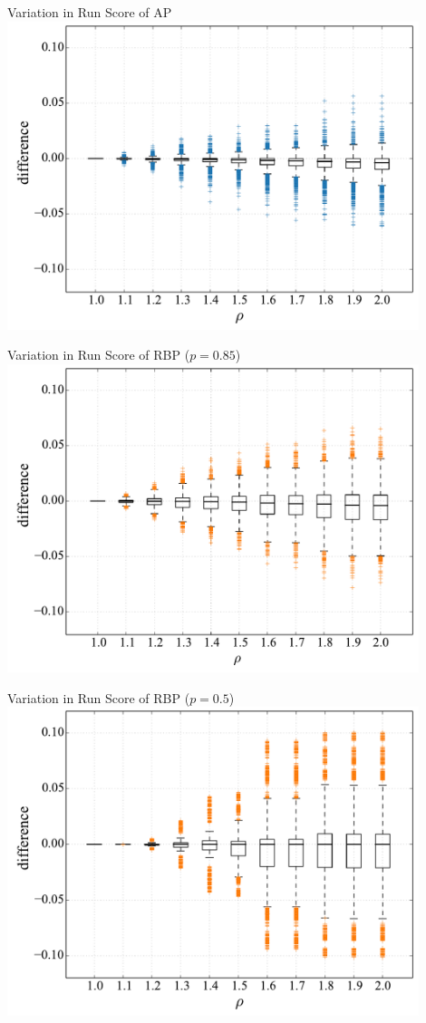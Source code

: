 \documentclass{beamer}
\begin{document}
\begin{frame}{Variation in Run Score of AP}
\includegraphics[width=0.9\textwidth]{figs/fig-score-variation-ap.pdf}
\end{frame}

\begin{frame}{Variation in Run Score of RBP ($p = 0.85$)}
\includegraphics[width=0.9\textwidth]{figs/fig-score-variation-rbp85.pdf}
\end{frame}

\begin{frame}{Variation in Run Score of RBP ($p = 0.5$)}
\includegraphics[width=0.9\textwidth]{figs/fig-score-variation-rbp50.pdf}
\end{frame}
\end{document}
